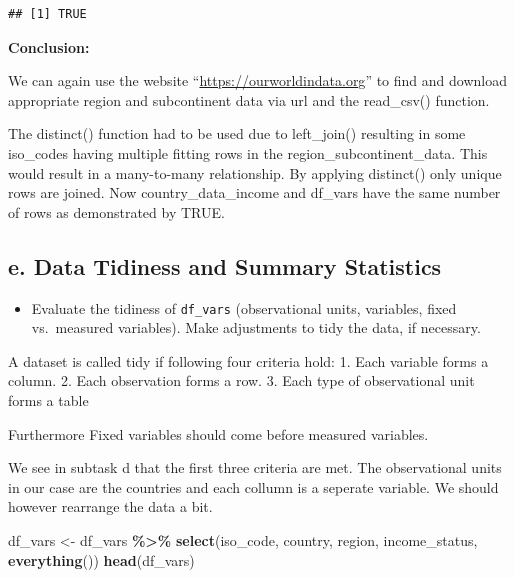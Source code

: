 \documentclass[
]{article}
\newenvironment{Shaded}{\begin{snugshade}}{\end{snugshade}}
\newcommand{\FunctionTok}[1]{\textcolor[rgb]{0.13,0.29,0.53}{\textbf{#1}}}
\newcommand{\NormalTok}[1]{#1}
\newcommand{\OtherTok}[1]{\textcolor[rgb]{0.56,0.35,0.01}{#1}}
\newcommand{\SpecialCharTok}[1]{\textcolor[rgb]{0.81,0.36,0.00}{\textbf{#1}}}
\providecommand{\tightlist}{%
  \setlength{\itemsep}{0pt}\setlength{\parskip}{0pt}}
\begin{document}
\begin{verbatim}
## [1] TRUE
\end{verbatim}

\textbf{Conclusion:}

We can again use the website ``\url{https://ourworldindata.org}'' to
find and download appropriate region and subcontinent data via url and
the read\_csv() function.

The distinct() function had to be used due to left\_join() resulting in
some iso\_codes having multiple fitting rows in the
region\_subcontinent\_data. This would result in a many-to-many
relationship. By applying distinct() only unique rows are joined. Now
country\_data\_income and df\_vars have the same number of rows as
demonstrated by TRUE.

\subsection{e. Data Tidiness and Summary
Statistics}\label{e.-data-tidiness-and-summary-statistics}

\begin{itemize}
\tightlist
\item
  Evaluate the tidiness of \texttt{df\_vars} (observational units,
  variables, fixed vs.~measured variables). Make adjustments to tidy the
  data, if necessary.
\end{itemize}

A dataset is called tidy if following four criteria hold: 1. Each
variable forms a column. 2. Each observation forms a row. 3. Each type
of observational unit forms a table

Furthermore Fixed variables should come before measured variables.

We see in subtask d that the first three criteria are met. The
observational units in our case are the countries and each collumn is a
seperate variable. We should however rearrange the data a bit.

\begin{Shaded}
\begin{Highlighting}[]
\NormalTok{df\_vars }\OtherTok{\textless{}{-}}\NormalTok{ df\_vars }\SpecialCharTok{\%\textgreater{}\%}
  \FunctionTok{select}\NormalTok{(iso\_code, country, region, income\_status, }\FunctionTok{everything}\NormalTok{())}
\FunctionTok{head}\NormalTok{(df\_vars)}
\end{Highlighting}
\end{Shaded}
\end{document}
